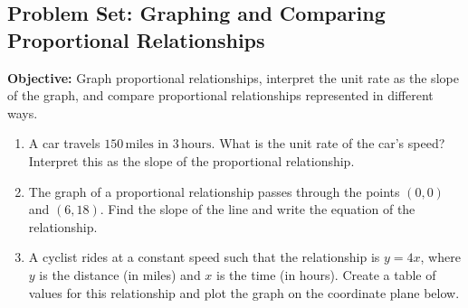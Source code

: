 \documentclass[12pt]{article}
\title{}
\date{}
\begin{document}
\subsection*{Problem Set: Graphing and Comparing Proportional Relationships}
\onehalfspacing

\begin{tcolorbox}[colframe=black!40, colback=gray!5, 
coltitle=black, colbacktitle=black!20, fonttitle=\bfseries\Large, 
title=Learning Objective, halign title=center, left=5pt, right=5pt, top=5pt, bottom=15pt]
\textbf{Objective:} Graph proportional relationships, interpret the unit rate as the slope of the graph, and compare proportional relationships represented in different ways.
\end{tcolorbox}

\begin{tcolorbox}[colframe=black!60, colback=white, 
coltitle=black, colbacktitle=black!15, fonttitle=\bfseries\Large, 
title=Exercises: Unit Rate and Slope, halign title=center, left=10pt, right=10pt, top=10pt, bottom=20pt]
\begin{enumerate}[itemsep=3em]
    \item A car travels \(150 \, \text{miles}\) in \(3 \, \text{hours}\). What is the unit rate of the car's speed? Interpret this as the slope of the proportional relationship.

    \item The graph of a proportional relationship passes through the points \((0, 0)\) and \((6, 18)\). Find the slope of the line and write the equation of the relationship.

    \item A cyclist rides at a constant speed such that the relationship is \(y = 4x\), where \(y\) is the distance (in miles) and \(x\) is the time (in hours). Create a table of values for this relationship and plot the graph on the coordinate plane below.
    
    \begin{center}
    \end{center}
\end{enumerate}
\end{tcolorbox}
\end{document}

